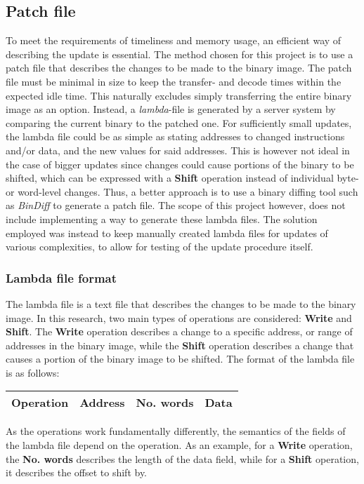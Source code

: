 
\subsection{Patch file}\label{sec:patchfile}
To meet the requirements of timeliness and memory usage, an efficient way of describing the update is essential. The method chosen for this project is to use a patch file that describes the changes to be made to the binary image.
The patch file must be minimal in size to keep the transfer- and decode times within the expected idle time. This naturally excludes simply transferring the entire binary image as an option. Instead, a \textit{lambda}-file is generated by a server system by comparing the current binary to the patched one. For sufficiently small updates, the lambda file could be as simple as stating addresses to changed instructions and/or data, and the new values for said addresses. This is however not ideal in the case of bigger updates since changes could cause portions of the binary to be shifted, which can be expressed with a \textbf{Shift} operation instead of individual byte- or word-level changes. Thus, a better approach is to use a binary diffing tool such as \textit{BinDiff} to generate a patch file. The scope of this project however, does not include implementing a way to generate these lambda files. The solution employed was instead to keep manually created lambda files for updates of various complexities, to allow for testing of the update procedure itself. 

\subsubsection*{Lambda file format}
The lambda file is a text file that describes the changes to be made to the binary image. In this research, two main types of operations are considered: \textbf{Write} and \textbf{Shift}. The \textbf{Write} operation describes a change to a specific address, or range of addresses in the binary image, while the \textbf{Shift} operation describes a change that causes a portion of the binary image to be shifted. The format of the lambda file is as follows:

\begin{center}
\begin{tabular}{|c|c|c|c|}
\hline
\textbf{Operation} & \textbf{Address} & \textbf{No. words}  & \textbf{Data} \\
\hline
\end{tabular}
\end{center}
As the operations work fundamentally differently, the semantics of the fields of the lambda file depend on the operation. As an example, for a \textbf{Write} operation, the \textbf{No. words} describes the length of the data field, while for a \textbf{Shift} operation, it describes the offset to shift by.
